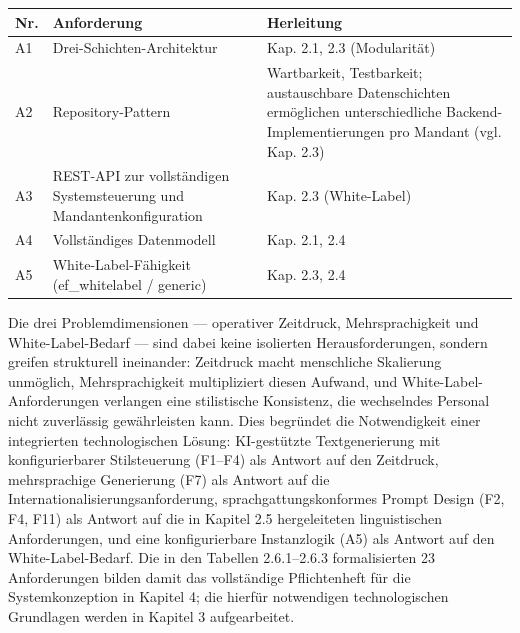 {\def\LTcaptype{none} %
\begin{longtable}[]{@{}
  >{\raggedright\arraybackslash}p{}
  >{\raggedright\arraybackslash}p{}
  >{\raggedright\arraybackslash}p{}@{}}
\toprule\noalign{}
\begin{minipage}[b]{\linewidth}\raggedright
Nr.
\end{minipage} & \begin{minipage}[b]{\linewidth}\raggedright
Anforderung
\end{minipage} & \begin{minipage}[b]{\linewidth}\raggedright
Herleitung
\end{minipage} \\
\midrule\noalign{}
\endhead
\bottomrule\noalign{}
\endlastfoot
A1 & Drei-Schichten-Architektur & Kap. 2.1, 2.3 (Modularität) \\
A2 & Repository-Pattern & Wartbarkeit, Testbarkeit; austauschbare
Datenschichten ermöglichen unterschiedliche Backend-Implementierungen
pro Mandant (vgl. Kap. 2.3) \\
A3 & REST-API zur vollständigen Systemsteuerung und
Mandantenkonfiguration & Kap. 2.3 (White-Label) \\
A4 & Vollständiges Datenmodell & Kap. 2.1, 2.4 \\
A5 & White-Label-Fähigkeit (ef\_whitelabel / generic) & Kap. 2.3, 2.4 \\
\end{longtable}
}

Die drei Problemdimensionen --- operativer Zeitdruck, Mehrsprachigkeit
und White-Label-Bedarf --- sind dabei keine isolierten
Herausforderungen, sondern greifen strukturell ineinander: Zeitdruck
macht menschliche Skalierung unmöglich, Mehrsprachigkeit multipliziert
diesen Aufwand, und White-Label-Anforderungen verlangen eine
stilistische Konsistenz, die wechselndes Personal nicht zuverlässig
gewährleisten kann. Dies begründet die Notwendigkeit einer integrierten
technologischen Lösung: KI-gestützte Textgenerierung mit
konfigurierbarer Stilsteuerung (F1--F4) als Antwort auf den Zeitdruck,
mehrsprachige Generierung (F7) als Antwort auf die
Internationalisierungsanforderung, sprachgattungskonformes Prompt Design
(F2, F4, F11) als Antwort auf die in Kapitel 2.5 hergeleiteten
linguistischen Anforderungen, und eine konfigurierbare Instanzlogik (A5)
als Antwort auf den White-Label-Bedarf. Die in den Tabellen 2.6.1--2.6.3
formalisierten 23 Anforderungen bilden damit das vollständige
Pflichtenheft für die Systemkonzeption in Kapitel 4; die hierfür
notwendigen technologischen Grundlagen werden in Kapitel 3
aufgearbeitet.
